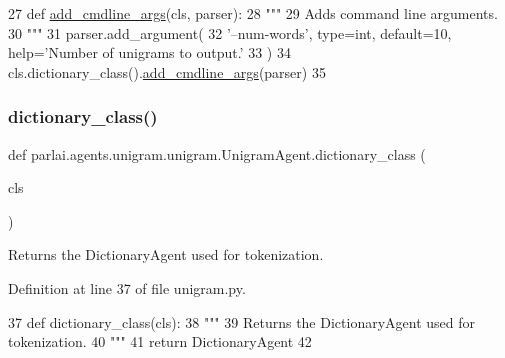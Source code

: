 \begin{DoxyCode}
27     \textcolor{keyword}{def }\hyperlink{namespaceparlai_1_1agents_1_1drqa_1_1config_a62fdd5554f1da6be0cba185271058320}{add\_cmdline\_args}(cls, parser):
28         \textcolor{stringliteral}{"""}
29 \textcolor{stringliteral}{        Adds command line arguments.}
30 \textcolor{stringliteral}{        """}
31         parser.add\_argument(
32             \textcolor{stringliteral}{'--num-words'}, type=int, default=10, help=\textcolor{stringliteral}{'Number of unigrams to output.'}
33         )
34         cls.dictionary\_class().\hyperlink{namespaceparlai_1_1agents_1_1drqa_1_1config_a62fdd5554f1da6be0cba185271058320}{add\_cmdline\_args}(parser)
35 
\end{DoxyCode}
\mbox{\label{classparlai_1_1agents_1_1unigram_1_1unigram_1_1UnigramAgent_a832c1e669ba04ca3c6258216cc82bdca}} 
\subsubsection{\texorpdfstring{dictionary\+\_\+class()}{dictionary\_class()}}
{\footnotesize\ttfamily def parlai.\+agents.\+unigram.\+unigram.\+Unigram\+Agent.\+dictionary\+\_\+class (\begin{DoxyParamCaption}\item[{}]{cls }\end{DoxyParamCaption})}

\begin{DoxyVerb}Returns the DictionaryAgent used for tokenization.
\end{DoxyVerb}
 

Definition at line 37 of file unigram.\+py.


\begin{DoxyCode}
37     \textcolor{keyword}{def }dictionary\_class(cls):
38         \textcolor{stringliteral}{"""}
39 \textcolor{stringliteral}{        Returns the DictionaryAgent used for tokenization.}
40 \textcolor{stringliteral}{        """}
41         \textcolor{keywordflow}{return} DictionaryAgent
42 
\end{DoxyCode}
\mbox{\label{classparlai_1_1agents_1_1unigram_1_1unigram_1_1UnigramAgent_a0688b7cf7ef26834f8ff11f0893fa45b}} 
